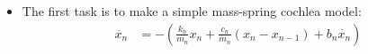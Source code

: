 

\begin{itemize}
\item The first task is to make a simple mass-spring cochlea model:
\begin{align*}
	\ddot{x_n} &= - \left( \frac{k_n}{m_n} x_n + \frac{c_n}{m_n} (x_n-x_{n-1}) + b_n \dot{x_n} \right)
\end{align*}
\end{itemize}


